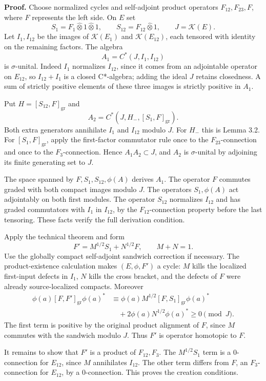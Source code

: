 \documentclass[
  11pt,
]{article}
\begin{document}
\textbf{Proof.} Choose normalized cycles and self-adjoint product
operators \(F_{12},F_{23},F\), where \(F\) represents the left side. On
\(E\) set \[
S_1=F_1\widehat\otimes1\widehat\otimes1,\qquad
S_{12}=F_{12}\widehat\otimes1,\qquad J=\mathcal K(E).
\] Let \(I_1,I_{12}\) be the images of \(\mathcal K(E_1)\) and
\(\mathcal K(E_{12})\), each tensored with identity on the remaining
factors. The algebra \[
A_1=C^*(J,I_1,I_{12})
\] is \(\sigma\)-unital. Indeed \(I_1\) normalizes \(I_{12}\), since it
comes from an adjointable operator on \(E_{12}\), so \(I_{12}+I_1\) is a
closed C*-algebra; adding the ideal \(J\) retains closedness. A sum of
strictly positive elements of these three images is strictly positive in
\(A_1\).

Put \(H=[S_{12},F]_{\mathrm{gr}}\) and \[
A_2=C^*(J,H_-,[S_1,F]_{\mathrm{gr}}).
\] Both extra generators annihilate \(I_1\) and \(I_{12}\) modulo \(J\).
For \(H_-\) this is Lemma 3.2. For \([S_1,F]_{\mathrm{gr}}\), apply the
first-factor commutator rule once to the \(F_{23}\)-connection and once
to the \(F_3\)-connection. Hence \(A_1A_2\subset J\), and \(A_2\) is
\(\sigma\)-unital by adjoining its finite generating set to \(J\).

The space spanned by \(F,S_1,S_{12},\phi(A)\) derives \(A_1\). The
operator \(F\) commutes graded with both compact images modulo \(J\).
The operators \(S_1,\phi(A)\) act adjointably on both first modules. The
operator \(S_{12}\) normalizes \(I_{12}\) and has graded commutators
with \(I_1\) in \(I_{12}\), by the \(F_{12}\)-connection property before
the last tensoring. These facts verify the full derivation condition.

Apply the technical theorem and form \[
F'=M^{1/2}S_1+N^{1/2}F,\qquad M+N=1.
\tag{4.2}
\] Use the globally compact self-adjoint sandwich correction if
necessary. The product-existence calculation makes \((E,\phi,F')\) a
cycle: \(M\) kills the localized first-input defects in \(I_1\), \(N\)
kills the cross bracket, and the defects of \(F\) were already
source-localized compacts. Moreover \[
\begin{aligned}
\phi(a)[F,F']_{\mathrm{gr}}\phi(a)^*
&\equiv\phi(a)M^{1/2}[F,S_1]_{\mathrm{gr}}\phi(a)^*\\
&\quad+2\phi(a)N^{1/2}\phi(a)^*\geq0\pmod J.
\end{aligned}
\] The first term is positive by the original product alignment of
\(F\), since \(M\) commutes with the sandwich modulo \(J\). Thus \(F'\)
is operator homotopic to \(F\).

It remains to show that \(F'\) is a product of \(F_{12},F_3\). The
\(M^{1/2}S_1\) term is a \(0\)-connection for \(E_{12}\), since \(M\)
annihilates \(I_{12}\). The other term differs from \(F\), an
\(F_3\)-connection for \(E_{12}\), by a \(0\)-connection. This proves
the creation conditions.
\end{document}

